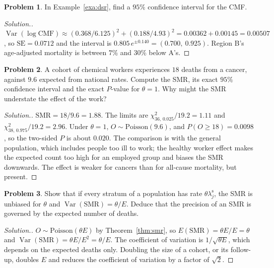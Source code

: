 \documentclass[11pt,a4paper]{article}
\numberwithin{equation}{section}
\DeclareMathOperator{\Var}{Var}
\theoremstyle{definition}
\newtheorem{problemx}{Problem}[subsection]
\newenvironment{problem}{\begin{problemx}}{\end{problemx}}
\newenvironment{solution}
  {\renewcommand{\qedsymbol}{}\begin{proof}[\textit{Solution}.]}
  {\end{proof}}
\begin{document}
\begin{problem}
In Example~\ref{exa:dsr}, find a $95\%$ confidence interval for the CMF.
\end{problem}

\begin{solution}
$\Var(\log\text{CMF}) \approx (0.368/6.125)^2 + (0.188/4.93)^2 = 0.00362 + 0.00145 = 0.00507$, so $\text{SE} = 0.0712$ and the interval is
$0.805\,e^{\pm 0.140} = (0.700,\ 0.925)$. Region B's age-adjusted mortality is between $7\%$ and $30\%$ below A's.
\end{solution}

\begin{problem}
A cohort of chemical workers experiences $18$ deaths from a cancer, against $9.6$ expected from national rates. Compute the SMR, its exact
$95\%$ confidence interval and the exact $P$-value for $\theta = 1$. Why might the SMR understate the effect of the work?
\end{problem}

\begin{solution}
$\text{SMR} = 18/9.6 = 1.88$. The limits are $\chi^2_{36,\,0.025}/19.2 = 1.11$ and $\chi^2_{38,\,0.975}/19.2 = 2.96$. Under $\theta = 1$, $O \sim \text{Poisson}(9.6)$, and $P(O \geq 18) = 0.0098$,
so the two-sided $P$ is about $0.020$. The comparison is with the general population, which includes people too ill to work; the
healthy worker effect makes the expected count too high for an employed group and biases the SMR downwards. The effect is weaker for
cancers than for all-cause mortality, but present.
\end{solution}

\begin{problem}
Show that if every stratum of a population has rate $\theta\lambda^{\text{s}}_j$, the SMR is unbiased for $\theta$ and $\Var(\text{SMR}) = \theta/E$. Deduce that the precision of an
SMR is governed by the expected number of deaths.
\end{problem}

\begin{solution}
$O \sim \text{Poisson}(\theta E)$ by Theorem~\ref{thm:smr}, so $E(\text{SMR}) = \theta E/E = \theta$ and $\Var(\text{SMR}) = \theta E/E^2 = \theta/E$. The coefficient of variation is $1/\sqrt{\theta E}$,
which depends on the expected deaths only. Doubling the size of a cohort, or its follow-up, doubles $E$ and reduces the coefficient of
variation by a factor of $\sqrt 2$.
\end{solution}
\end{document}

